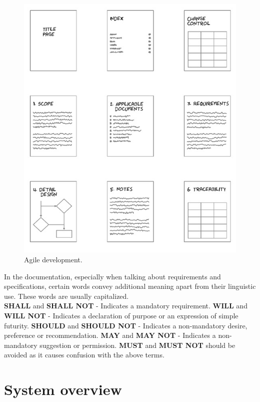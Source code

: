\documentclass[a4paper]{article}
\begin{document}
\begin{figure}
\centering
\includegraphics[width=1\linewidth]{./pictures/image1.jpg}
\caption{\label{fig:Agile}Agile development.}
\end{figure}

In the documentation, especially when talking about requirements and specifications, certain words convey additional meaning apart from their linguistic use. These words are usually capitalized.\\
\textbf{SHALL} and \textbf{SHALL NOT} - Indicates a mandatory requirement.
\textbf{WILL} and \textbf{WILL NOT} - Indicates a declaration of purpose or an expression of simple futurity.
\textbf{SHOULD} and \textbf{SHOULD NOT} - Indicates a non-mandatory desire, preference or recommendation.
\textbf{MAY} and \textbf{MAY NOT} - Indicates a non-mandatory suggestion or permission.
\textbf{MUST} and \textbf{MUST NOT} should be avoided as it causes confusion with the above terms. \\
\newpage

\section{System overview}
\end{document}

